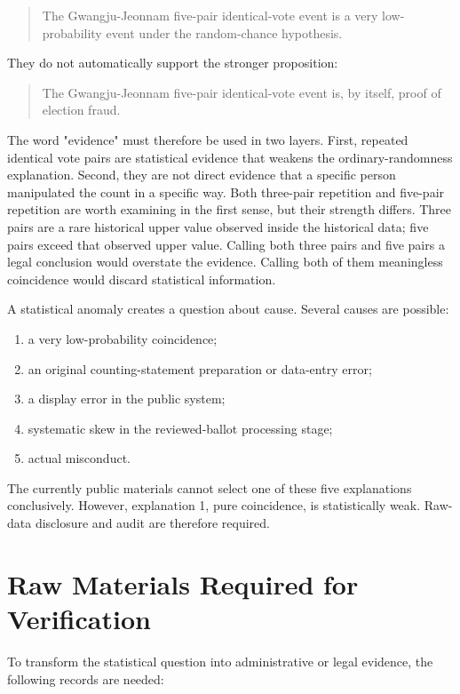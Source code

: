 \documentclass[preprint]{../ieie/IEIE}
\begin{document}
\begin{quote}
The Gwangju-Jeonnam five-pair identical-vote event is a very low-probability event under the random-chance hypothesis.
\end{quote}

They do not automatically support the stronger proposition:

\begin{quote}
The Gwangju-Jeonnam five-pair identical-vote event is, by itself, proof of election fraud.
\end{quote}

The word "evidence" must therefore be used in two layers. First, repeated identical vote pairs are statistical evidence that weakens the ordinary-randomness explanation. Second, they are not direct evidence that a specific person manipulated the count in a specific way. Both three-pair repetition and five-pair repetition are worth examining in the first sense, but their strength differs. Three pairs are a rare historical upper value observed inside the historical data; five pairs exceed that observed upper value. Calling both three pairs and five pairs a legal conclusion would overstate the evidence. Calling both of them meaningless coincidence would discard statistical information.

A statistical anomaly creates a question about cause. Several causes are possible:

\begin{enumerate}
\item a very low-probability coincidence;
\item an original counting-statement preparation or data-entry error;
\item a display error in the public system;
\item systematic skew in the reviewed-ballot processing stage;
\item actual misconduct.
\end{enumerate}

The currently public materials cannot select one of these five explanations conclusively. However, explanation 1, pure coincidence, is statistically weak. Raw-data disclosure and audit are therefore required.

\section{Raw Materials Required for Verification}

To transform the statistical question into administrative or legal evidence, the following records are needed:
\end{document}
